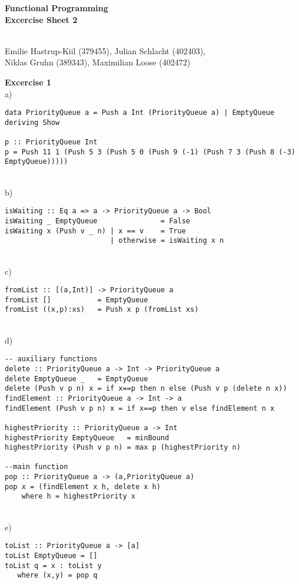 \documentclass[a4paper,12pt,oneside]{book}
\begin{document}
\setlength{\parindent}{0em} 


\begin{center} 
\textbf{\huge{Functional Programming} \\ \large{ Excercise Sheet 2}} %

~\\
Emilie Hastrup-Kiil (379455), 
Julian Schlacht (402403), \\
Niklas Gruhn (389343), 
Maximilian Loose (402472)
\end{center}
\textbf{Excercise 1} \\ %
a)
\begin{lstlisting}
data PriorityQueue a = Push a Int (PriorityQueue a) | EmptyQueue deriving Show

p :: PriorityQueue Int
p = Push 11 1 (Push 5 3 (Push 5 0 (Push 9 (-1) (Push 7 3 (Push 8 (-3) EmptyQueue)))))
\end{lstlisting}
~\\
b)
\begin{lstlisting}
isWaiting :: Eq a => a -> PriorityQueue a -> Bool
isWaiting _ EmptyQueue               = False
isWaiting x (Push v _ n) | x == v    = True
                         | otherwise = isWaiting x n
\end{lstlisting}
~\\           
c)
\begin{lstlisting}
fromList :: [(a,Int)] -> PriorityQueue a
fromList []           = EmptyQueue
fromList ((x,p):xs)   = Push x p (fromList xs)
\end{lstlisting}
~\\
d)
\begin{lstlisting}
-- auxiliary functions
delete :: PriorityQueue a -> Int -> PriorityQueue a
delete EmptyQueue _   = EmptyQueue
delete (Push v p n) x = if x==p then n else (Push v p (delete n x)) 
findElement :: PriorityQueue a -> Int -> a
findElement (Push v p n) x = if x==p then v else findElement n x

highestPriority :: PriorityQueue a -> Int
highestPriority EmptyQueue   = minBound
highestPriority (Push v p n) = max p (highestPriority n)

--main function
pop :: PriorityQueue a -> (a,PriorityQueue a)
pop x = (findElement x h, delete x h)
    where h = highestPriority x
\end{lstlisting}
~\\
e)
\begin{lstlisting}
toList :: PriorityQueue a -> [a]
toList EmptyQueue = []
toList q = x : toList y
   where (x,y) = pop q
\end{lstlisting}
\end{document}
